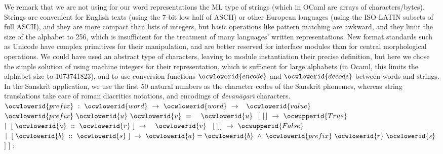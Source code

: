 \documentclass[12pt]{article}
\begin{document}
\ocwendcode{}\ocwindent{0.00em}
We remark that we are not using for our word representations the ML type
of strings (which in OCaml are arrays of characters/bytes). Strings are
convenient for English texts (using the 7-bit low half of ASCII) or other
European languages (using the ISO-LATIN subsets of full ASCII), and they are 
more compact than lists of integers, but basic operations like pattern matching
are awkward, and they limit the size of the alphabet to 256, which is 
insufficient for the treatment of many languages' written representations.
New format standards such as Unicode have complex primitives for their
manipulation, and are better reserved for interface modules than for central
morphological operations. We could have used an abstract type of characters,
leaving to module instantiation their precise definition, but here we
chose the simple solution of using machine integers for their representation, 
which is sufficient for large alphabets (in Ocaml, this limits the alphabet 
size to 1073741823), and to use conversion functions \ocwbegindcode{}$\ocwlowerid{encode}$\ocwenddcode{} and \ocwbegindcode{}$\ocwlowerid{decode}$\ocwenddcode{} 
between words and strings. 
In the Sanskrit application, we use the first 50 natural numbers as the 
character codes of the Sanskrit phonemes, whereas string translations take 
care of roman diacritics notations, and encodings of {\sl devan\=agar{\=\i}} 
characters. 
\ocweol
\ocwindent{0.00em}
\ocwbegindcode{}$\ocwlowerid{prefix}~:~\ocwlowerid{word}~\rightarrow{}~\ocwlowerid{word}~\rightarrow{}~$\ocwenddcode{} 
\ocweol
\label{../ML/word.ml:2103}%
\medskip
\ocwbegincode{}\ocwindent{0.00em}
$\ocwlowerid{value}~$~$\ocwlowerid{prefix}~\ocwlowerid{u}~\ocwlowerid{v}~=~$\ocweol
\ocwindent{1.00em}
~$\ocwlowerid{u}~$\ocweol
\ocwindent{2.00em}
$[~[\,]~\rightarrow{}~\ocwupperid{True}$\ocweol
\ocwindent{2.00em}
$\mid{}~[~\ocwlowerid{a}~::~\ocwlowerid{r}~]~\rightarrow{}~$~$\ocwlowerid{v}~$\ocweol
\ocwindent{4.00em}
$[~[\,]~\rightarrow{}~\ocwupperid{False}$\ocweol
\ocwindent{4.00em}
$\mid{}~[~\ocwlowerid{b}~::~\ocwlowerid{s}~]~\rightarrow{}~\ocwlowerid{a}=\ocwlowerid{b}~\land{}~\ocwlowerid{prefix}~\ocwlowerid{r}~\ocwlowerid{s}~$\ocweol
\ocwindent{4.00em}
$]$\ocweol
\ocwindent{2.00em}
$]$\ocweol
\ocwindent{0.00em}
;\medskip
\end{document}
